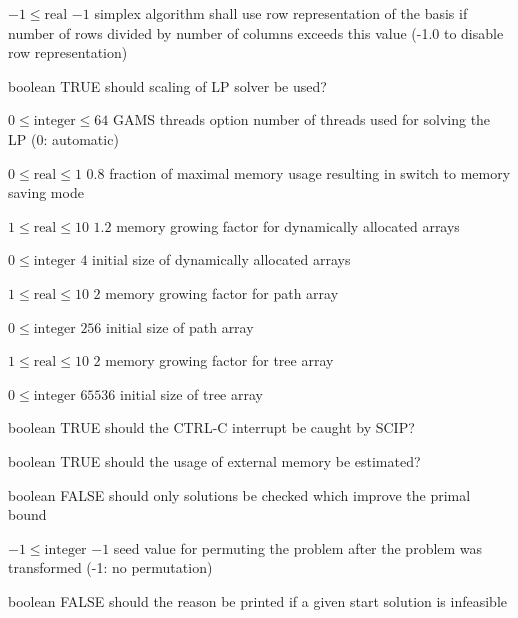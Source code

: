 %
{$-1\leq\textrm{real}$}%
{$-1$}%
{simplex algorithm shall use row representation of the basis if number of rows divided by number of columns exceeds this value (-1.0 to disable row representation)}%
{}

%
{boolean}%
{TRUE}%
{should scaling of LP solver be used?}%
{}

%
{$0\leq\textrm{integer}\leq64$}%
{GAMS threads option}%
{number of threads used for solving the LP (0: automatic)}%
{}

%
{$0\leq\textrm{real}\leq1$}%
{$0.8$}%
{fraction of maximal memory usage resulting in switch to memory saving mode}%
{}

%
{$1\leq\textrm{real}\leq10$}%
{$1.2$}%
{memory growing factor for dynamically allocated arrays}%
{}

%
{$0\leq\textrm{integer}$}%
{$4$}%
{initial size of dynamically allocated arrays}%
{}

%
{$1\leq\textrm{real}\leq10$}%
{$2$}%
{memory growing factor for path array}%
{}

%
{$0\leq\textrm{integer}$}%
{$256$}%
{initial size of path array}%
{}

%
{$1\leq\textrm{real}\leq10$}%
{$2$}%
{memory growing factor for tree array}%
{}

%
{$0\leq\textrm{integer}$}%
{$65536$}%
{initial size of tree array}%
{}

%
{boolean}%
{TRUE}%
{should the CTRL-C interrupt be caught by SCIP?}%
{}

%
{boolean}%
{TRUE}%
{should the usage of external memory be estimated?}%
{}

%
{boolean}%
{FALSE}%
{should only solutions be checked which improve the primal bound}%
{}

%
{$-1\leq\textrm{integer}$}%
{$-1$}%
{seed value for permuting the problem after the problem was transformed (-1: no permutation)}%
{}

%
{boolean}%
{FALSE}%
{should the reason be printed if a given start solution is infeasible}%
{}

